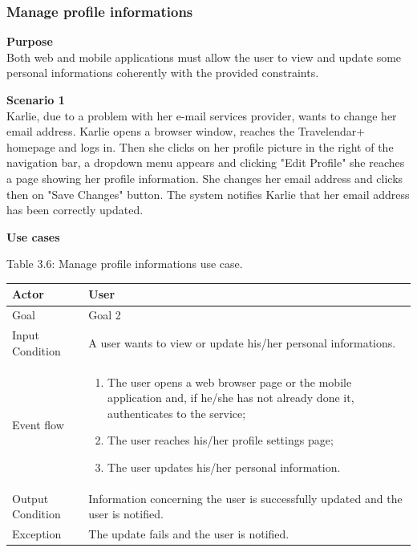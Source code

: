 \documentclass{article}
\begin{document}
	\subsubsection{Manage profile informations}
	
	\bigskip
	\noindent
	\textbf{Purpose} \\
	Both web and mobile applications must allow the user to view and update some personal informations coherently with the provided constraints.
	
	\bigskip
	\noindent
	\textbf{Scenario 1} \\
	Karlie, due to a problem with her e-mail services provider, wants to change her email address. Karlie opens a browser window, reaches the Travelendar+ homepage and logs in. Then she clicks on her profile picture in the right of the navigation bar, a dropdown menu appears and clicking "Edit Profile" she reaches a page showing her profile information. She changes her email address and clicks then on "Save Changes" button. The system notifies Karlie that her email address has been correctly updated.
	
	\bigskip
	\noindent
	\textbf{Use cases} \\
	
	\begin{center}
		Table 3.6: Manage profile informations use case.
		
		\bigskip
   		\begin{tabular}{p{}|p{}}
   		 	\hline
    			Actor & User \\ \hline
    			Goal & Goal 2 \\ \hline
    			Input Condition & A user wants to view or update his/her personal informations. \\ \hline
    			Event flow & 
			\begin{enumerate}
  				\item The user opens a web browser page or the mobile application and, if he/she has not already done it, authenticates to the service;
  				\item The user reaches his/her profile settings page;
  				\item The user updates his/her personal information.
 			 \end{enumerate} \\ \hline
    			Output Condition & Information concerning the user is successfully updated and the user is notified. \\ \hline
    			Exception & The update fails and the user is notified.\\
    			\hline
    		\end{tabular}
	\end{center}
	
\end{document}
